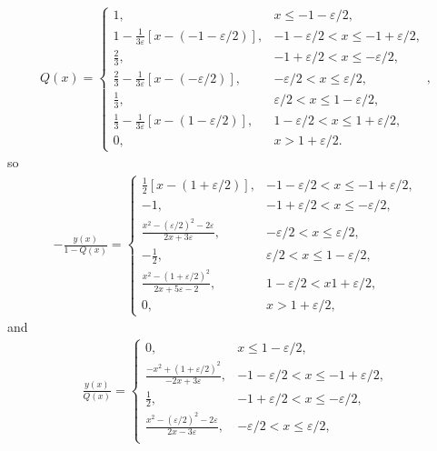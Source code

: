 \documentclass{assignment}
\begin{document}
\begin{sol}
\begin{itemize}
        \begin{align}
            Q(x)=\left\{\begin{array}{ll}
                1,&x\leq-1-\varepsilon/2,\\
                1-\frac{1}{3\varepsilon}[x-(-1-\varepsilon/2)],&-1-\varepsilon/2<x\leq-1+\varepsilon/2,\\
                \frac{2}{3},&-1+\varepsilon/2<x\leq-\varepsilon/2,\\
                \frac{2}{3}-\frac{1}{3\varepsilon}[x-(-\varepsilon/2)],&-\varepsilon/2<x\leq\varepsilon/2,\\
                \frac{1}{3},&\varepsilon/2<x\leq 1-\varepsilon/2,\\
                \frac{1}{3}-\frac{1}{3\varepsilon}[x-(1-\varepsilon/2)],&1-\varepsilon/2<x\leq 1+\varepsilon/2,\\
                0,&x>1+\varepsilon/2.
            \end{array}\right.,
        \end{align}
        so
        \begin{align}
            -\frac{y(x)}{1-Q(x)}=\left\{\begin{array}{ll}
                \frac{1}{2}[x-(1+\varepsilon/2)],&-1-\varepsilon/2<x\leq-1+\varepsilon/2,\\
                -1,&-1+\varepsilon/2<x\leq-\varepsilon/2,\\
                \frac{x^2-(\varepsilon/2)^2-2\varepsilon}{2x+3\varepsilon},&-\varepsilon/2<x\leq\varepsilon/2,\\
                -\frac{1}{2},&\varepsilon/2<x\leq 1-\varepsilon/2,\\
                \frac{x^2-(1+\varepsilon/2)^2}{2x+5\varepsilon-2},&1-\varepsilon/2<x1+\varepsilon/2,\\
                0,&x>1+\varepsilon/2,
            \end{array}\right.
        \end{align}
        and
        \begin{align}
            \frac{y(x)}{Q(x)}=\left\{\begin{array}{ll}
                0,&x\leq 1-\varepsilon/2,\\
                \frac{-x^2+(1+\varepsilon/2)^2}{-2x+3\varepsilon},&-1-\varepsilon/2<x\leq-1+\varepsilon/2,\\
                \frac{1}{2},&-1+\varepsilon/2<x\leq-\varepsilon/2,\\
                \frac{x^2-(\varepsilon/2)^2-2\varepsilon}{2x-3\varepsilon},&-\varepsilon/2<x\leq\varepsilon/2,\\

\end{array}
\end{align}
\end{itemize}
\end{sol}
\end{document}
